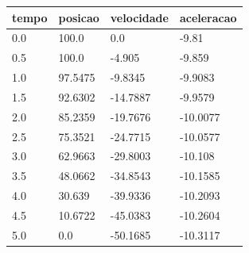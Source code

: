 \begin{tabular}{llll}
\toprule
tempo & posicao & velocidade & aceleracao \\
\midrule
0.0 & 100.0 & 0.0 & -9.81 \\
0.5 & 100.0 & -4.905 & -9.859 \\
1.0 & 97.5475 & -9.8345 & -9.9083 \\
1.5 & 92.6302 & -14.7887 & -9.9579 \\
2.0 & 85.2359 & -19.7676 & -10.0077 \\
2.5 & 75.3521 & -24.7715 & -10.0577 \\
3.0 & 62.9663 & -29.8003 & -10.108 \\
3.5 & 48.0662 & -34.8543 & -10.1585 \\
4.0 & 30.639 & -39.9336 & -10.2093 \\
4.5 & 10.6722 & -45.0383 & -10.2604 \\
5.0 & 0.0 & -50.1685 & -10.3117 \\
\bottomrule
\end{tabular}
